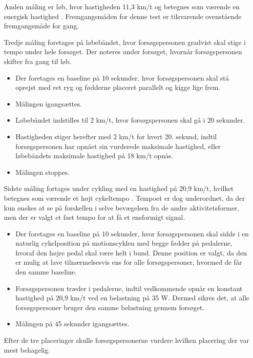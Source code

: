 Anden måling er løb, hvor hastigheden 11,3 km/t og betegnes som værende en energisk hastighed \citep{Miles2007}. Fremgangsmåden for denne test er tilsvarende ovenstående fremgangsmåde for gang.

Tredje måling foretages på løbebåndet, hvor forsøgspersonen gradvist skal stige i tempo under hele forsøget. Der noteres under forsøget, hvornår forsøgspersonen skifter fra gang til løb.  %
\begin{itemize}
	\item Der foretages en baseline på 10 sekunder, hvor forsøgspersonen skal stå oprejst med ret ryg og fødderne placeret parallelt og kigge lige frem.
	\item Målingen igangsættes.
	\item Løbebåndet indstilles til 2 km/t, hvor forsøgspersonen skal gå i 20 sekunder.  
	\item Hastigheden stiger herefter med 2 km/t for hvert 20. sekund, indtil forsøgspersonen har opnået sin vurderede maksimale hastighed, eller løbebåndets maksimale hastighed på 18 km/t opnås. 
	\item Målingen stoppes. 
\end{itemize}

Sidste måling fortages under cykling med en hastighed på 20,9 km/t, hvilket betegnes som værende et højt cykeltempo \citep{Miles2007}. Tempoet er dog underordnet, da der kun ønskes at se på forskellen i selve bevægelsen fra de andre aktivitetsformer, men der er valgt et fast tempo for at få et ensformigt signal. %
\begin{itemize}
	\item Der foretages en baseline på 10 sekunder, hvor forsøgspersonen skal sidde i en naturlig cykelposition på motionscyklen med begge fødder på pedalerne, hvoraf den højre pedal skal være helt i bund. Denne position er valgt, da den er mulig at lave tilnærmelsesvis ens for alle forsøgspersoner, hvormed de får den samme baseline.
	\item Forsøgspersonen træder i pedalerne, indtil vedkommende opnår en konstant hastighed på 20,9 km/t ved en belastning på 35 W. Dermed sikres det, at alle forsøgspersoner bruger den samme belastning gennem forsøget.  
	\item Målingen på 45 sekunder igangsættes. 
\end{itemize}
Efter de tre placeringer skulle forsøgspersonerne vurdere hvilken placering der var mest behagelig.

